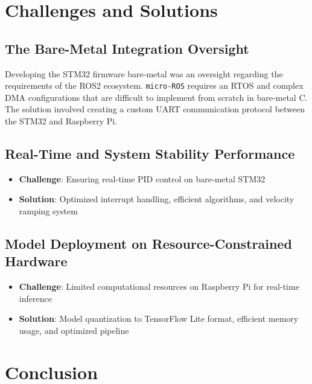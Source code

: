 \documentclass[12pt,a4paper]{article}
\begin{document}
	\section{Challenges and Solutions}
	
	\subsection{The Bare-Metal Integration Oversight}
	Developing the STM32 firmware bare-metal was an oversight regarding the requirements of the ROS2 ecosystem. \texttt{micro-ROS} requires an RTOS and complex DMA configurations that are difficult to implement from scratch in bare-metal C. The solution involved creating a custom UART communication protocol between the STM32 and Raspberry Pi.
	
	\subsection{Real-Time and System Stability Performance}
	\begin{itemize}
		\item \textbf{Challenge}: Ensuring real-time PID control on bare-metal STM32
		\item \textbf{Solution}: Optimized interrupt handling, efficient algorithms, and velocity ramping system
	\end{itemize}
	
	\subsection{Model Deployment on Resource-Constrained Hardware}
	\begin{itemize}
		\item \textbf{Challenge}: Limited computational resources on Raspberry Pi for real-time inference
		\item \textbf{Solution}: Model quantization to TensorFlow Lite format, efficient memory usage, and optimized pipeline
	\end{itemize}
	
	\section{Conclusion}
	
\end{document}

